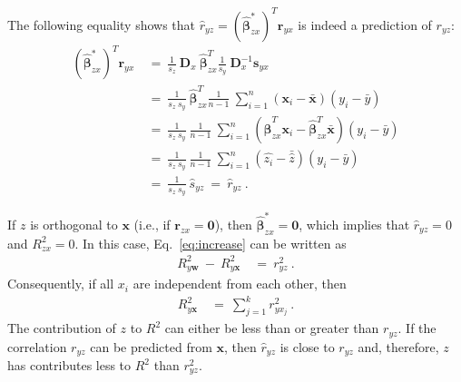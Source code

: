 \documentclass{article}
\newcommand\Br{\bm{r}}
\newcommand\Bs{\bm{s}}
\newcommand\Bw{\bm{w}}
\newcommand\Bx{\bm{x}}
\newcommand\BD{\bm{D}}
\newcommand\Bbe{\bm{\beta}}
\newcommand\BZe{\bm{0}}
\begin{document}
\begin{appendices}
The following equality shows
that $\hat{r}_{yz}=(\hat{\Bbe}^*_{zx})^T \Br_{yx}$ is indeed a
prediction of $r_{yz}$:
\begin{align}
\label{eq:empCorr}
 \left(\hat{\Bbe}^*_{zx} \right)^T \Br_{yx} \ &= \
 \frac{1}{s_z} \ \BD_x \  \hat{\Bbe}_{zx}^T \frac{1}{s_y} \ \BD_x^{-1} \Bs_{yx} \\ \nonumber
  &= \ \frac{1}{s_z \ s_y} \ \hat{\Bbe}_{zx}^T \frac{1}{n-1} \
    \sum_{i=1}^{n} (\Bx_i-\bar{\Bx})(y_i-\bar{y}) \\ \nonumber
  &= \ \frac{1}{s_z \ s_y} \ \frac{1}{n-1} \ \sum_{i=1}^{n}
    (\hat{\Bbe}_{zx}^T \Bx_i-\hat{\Bbe}_{zx}^T \bar{\Bx})(y_i-\bar{y}) \\ \nonumber
  &= \ \frac{1}{s_z \ s_y} \ \frac{1}{n-1} \ \sum_{i=1}^{n}
    (\hat{z_i}-\bar{\hat{z}})(y_i-\bar{y}) \\ \nonumber
  &= \ \frac{1}{s_z \ s_y} \ \hat{s}_{yz} \ = \ \hat{r}_{yz} \ .
\end{align}

If $z$ is orthogonal to $\Bx$
(i.e., if $\Br_{zx}=\BZe$), then $\hat{\Bbe}^*_{zx}=\BZe$, which implies
that $\hat{r}_{yz}=0$ and $R^2_{zx}=0$. In this case,
Eq.~\eqref{eq:increase} can be written as
\begin{align}
 R^2_{y\Bw} \ - \ R^2_{y\Bx} \ &= \  r_{yz}^2 \ .
\end{align}
Consequently, if all $x_i$ are independent from each other, then
\begin{align}
R^2_{y\Bx} \ &= \  \sum_{j=1}^{k} r_{y x_j}^2 \ .
\end{align}
The contribution of $z$ to $R^2$ can either be less than or
greater than $r_{yz}$.
If the correlation $r_{yz}$ can be predicted from $\Bx$, then
$\hat{r}_{yz}$ is close to $r_{yz}$ and, therefore, $z$ has
contributes less to $R^2$ than $r_{yz}^2$.


\end{appendices}
\end{document}
